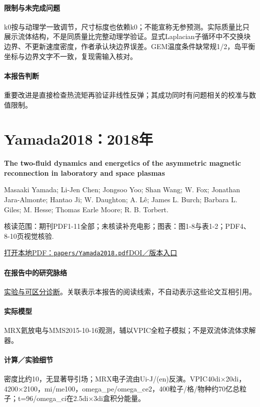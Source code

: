 \paragraph{限制与未完成问题}k0按与动理学一致调节，尺寸标度也依赖k0；不能宣称无参预测。实际质量比只展示流体结构，不是同质量比完整动理学验证。显式Laplacian子循环中不交换块边界、不更新速度密度，作者承认块边界误差。GEM温度条件缺常规1/2，岛平衡坐标与边界文字不一致，复现需输入核对。

\paragraph{本报告判断}重要改进是直接检查热流矩再验证非线性反弹；其成功同时有问题相关的校准与数值限制。

\section{Yamada2018：2018年}\label{paper:Yamada2018}

\textbf{The two-fluid dynamics and energetics of the asymmetric magnetic reconnection in laboratory and space plasmas}\citep{Yamada2018}\

Masaaki Yamada;  Li‐Jen Chen;  Jongsoo Yoo;  Shan Wang;  W. Fox;  Jonathan Jara-Almonte;  Hantao Ji;  W. Daughton;  A. Lê;  James L. Burch;  Barbara L. Giles;  M. Hesse;  Thomas Earle Moore;  R. B. Torbert.

\textsf{核读范围：}期刊PDF1-11全部；未核读补充电影；\textsf{图表：}图1-8与表1-2；PDF4、8-10页视觉核验.

\href{run:papers/Yamada2018.pdf}{打开本地PDF：\texttt{papers/Yamada2018.pdf}}\quad\href{https://doi.org/10.1038/s41467-018-07680-2}{DOI／版本入口}

\paragraph{在报告中的研究脉络}\hyperref[story:diagnostic]{实验与可区分诊断}。关联表示本报告的阅读线索，不自动表示这些论文互相引用。

\paragraph{实际模型}MRX氦放电与MMS2015-10-16观测，辅以VPIC全粒子模拟；不是双流体流体求解器。

\paragraph{计算／实验细节}密度比约10，无显著导引场；MRX电子流由Ui-J/(en)反演。VPIC40di×20di，4200×2100，mi/me100，omega\_pe/omega\_ce2，400粒子/格/物种约70亿总粒子；t=96/omega\_ci在2.5di×3di盒积分能量。

